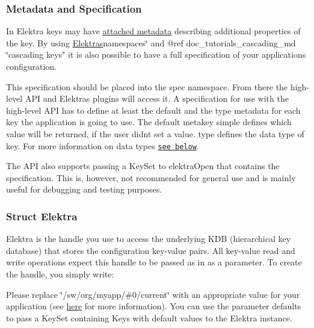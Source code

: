 \subsubsection*{Metadata and Specification}

In Elektra keys may have \hyperlink{doc_help_elektra-metadata_md}{attached metadata} describing additional properties of the key. By using \hyperlink{doc_tutorials_namespaces_md}{Elektra\textquotesingle{}s}namespaces\char`\"{} and @ref doc\+\_\+tutorials\+\_\+cascading\+\_\+md \char`\"{}cascading keys" it is also possible to have a full specification of your applications configuration.

This specification should be placed into the {\ttfamily spec} namespace. From there the high-\/level A\+PI and Elektra\textquotesingle{}s plugins will access it. A specification for use with the high-\/level A\+PI has to define at least the {\ttfamily default} and the {\ttfamily type} metadata for each key the application is going to use. The {\ttfamily default} metakey simple defines which value will be returned, if the user didn\textquotesingle{}t set a value. {\ttfamily type} defines the data type of key. For more information on data types \href{#data-types}{\tt see below}.

The A\+PI also supports passing a {\ttfamily Key\+Set} to {\ttfamily elektra\+Open} that contains the specification. This is, however, not recommended for general use and is mainly useful for debugging and testing purposes.

\subsubsection*{Struct {\ttfamily Elektra}}

{\ttfamily Elektra} is the handle you use to access the underlying K\+DB (hierarchical key database) that stores the configuration key-\/value pairs. All key-\/value read and write operations expect this handle to be passed as in as a parameter. To create the handle, you simply write\+:




Please replace {\ttfamily \char`\"{}/sw/org/myapp/\#0/current\char`\"{}} with an appropriate value for your application (see \hyperlink{doc_tutorials_application-integration_md}{here} for more information). You can use the parameter {\ttfamily defaults} to pass a {\ttfamily Key\+Set} containing {\ttfamily Key}s with default values to the {\ttfamily Elektra} instance.

